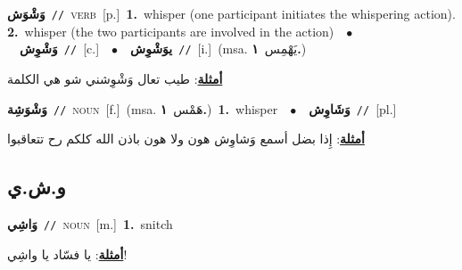 \documentclass[10pt,a4paper,twoside]{article} %
\begin{document}
\begin{multicols}{2}
{\setlength\topsep{0pt}\textbf{\foreignlanguage{arabic}{وَشْوَش}}\ {\color{gray}\texttt{//}\color{black}}\ \textsc{verb}\ [p.]\ \textbf{1.}~whisper (one participant initiates the whispering action).  \textbf{2.}~whisper (the two participants are involved in the action)\ \ $\bullet$\ \ \setlength\topsep{0pt}\textbf{\foreignlanguage{arabic}{وَشْوِش}}\ {\color{gray}\texttt{//}\color{black}}\ [c.]\ \ $\bullet$\ \ \setlength\topsep{0pt}\textbf{\foreignlanguage{arabic}{يوَشْوِش}}\ {\color{gray}\texttt{//}\color{black}}\ [i.]\ \color{gray}(msa. \foreignlanguage{arabic}{يَهْمِس}~\foreignlanguage{arabic}{\textbf{١.}})\color{black}\  \begin{flushright}\color{gray}\foreignlanguage{arabic}{\textbf{\underline{\foreignlanguage{arabic}{أمثلة}}}: طيب تعال وَشْوِشني شو هي الكلمة}\end{flushright}\color{black}} \vspace{2mm}

{\setlength\topsep{0pt}\textbf{\foreignlanguage{arabic}{وَشْوَشِة}}\ {\color{gray}\texttt{//}\color{black}}\ \textsc{noun}\ [f.]\ \color{gray}(msa. \foreignlanguage{arabic}{هَمْس}~\foreignlanguage{arabic}{\textbf{١.}})\color{black}\ \textbf{1.}~whisper\ \ $\bullet$\ \ \setlength\topsep{0pt}\textbf{\foreignlanguage{arabic}{وَشَاوِش}}\ {\color{gray}\texttt{//}\color{black}}\ [pl.]\  \begin{flushright}\color{gray}\foreignlanguage{arabic}{\textbf{\underline{\foreignlanguage{arabic}{أمثلة}}}: إِذا بضل أسمع وَشاوِش هون ولا هون باذن الله كلكم رح تتعاقبوا}\end{flushright}\color{black}} \vspace{2mm}

\vspace{-3mm}
\subsection*{\color{blue}\foreignlanguage{arabic}{و.ش.ي}\color{blue}{}} 

{\setlength\topsep{0pt}\textbf{\foreignlanguage{arabic}{وَاشِي}}\ {\color{gray}\texttt{//}\color{black}}\ \textsc{noun}\ [m.]\ \textbf{1.}~snitch\  \begin{flushright}\color{gray}\foreignlanguage{arabic}{\textbf{\underline{\foreignlanguage{arabic}{أمثلة}}}: يا فسّاد يا واشِي!}\end{flushright}\color{black}} \vspace{2mm}


\end{multicols}
\end{document}
